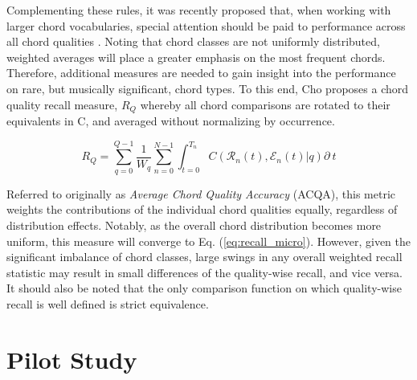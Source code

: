 Complementing these rules, it was recently proposed that, when working with larger chord vocabularies, special attention should be paid to performance across all chord qualities \cite{Cho2014Improved}.
Noting that chord classes are not uniformly distributed, weighted averages will place a greater emphasis on the most frequent chords.
Therefore, additional measures are needed to gain insight into the performance on rare, but musically significant, chord types.
To this end, Cho proposes a chord quality recall measure, $R_{Q}$ whereby all chord comparisons are rotated to their equivalents in C, and averaged without normalizing by occurrence.

\begin{equation}
R_{Q} = \sum_{q=0}^{Q-1}\frac{1}{W_q}\sum_{n=0}^{N-1}\int_{t=0}^{T_n}C(\mathcal{R}_n(t), \mathcal{E}_n(t) | q)\partial~t
\end{equation}

\noindent Referred to originally as \emph{Average Chord Quality Accuracy} (ACQA), this metric weights the contributions of the individual chord qualities equally, regardless of distribution effects.
Notably, as the overall chord distribution becomes more uniform, this measure will converge to Eq. (\ref{eq:recall_micro}).
However, given the significant imbalance of chord classes, large swings in any overall weighted recall statistic may result in small differences of the quality-wise recall, and vice versa.
It should also be noted that the only comparison function on which quality-wise recall is well defined is strict equivalence.


\section{Pilot Study}
\label{sec:pilot_study}

